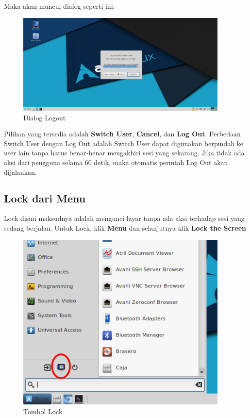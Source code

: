 \documentclass[12pt,]{article}
\begin{document}
	Maka akan muncul dialog seperti ini:

	\begin{figure}[!ht]
		\centering
		\includegraphics[width=300pt]{png/logoutdlg}
		\caption{Dialog Logout}
	\end{figure}

	Pilihan yang tersedia adalah \textbf{Switch User}, \textbf{Cancel}, dan \textbf{Log Out}.
	Perbedaan Switch User dengan Log Out adalah Switch User dapat digunakan berpindah ke user lain tanpa harus benar-benar mengakhiri sesi yang sekarang.
	Jika tidak ada aksi dari pengguna selama 60 detik, maka otomatis perintah Log Out akan dijalankan.

	\newpage

	\subsection{Lock dari Menu}

	Lock disini maksudnya adalah mengunci layar tanpa ada aksi terhadap sesi yang sedang berjalan.
	Untuk Lock, klik \textbf{Menu} dan selanjutnya klik \textbf{Lock the Screen}

	\begin{figure}[!ht]
		\centering
		\includegraphics[width=300pt]{png/lock}
		\caption{Tombol Lock}
	\end{figure}
\end{document}
